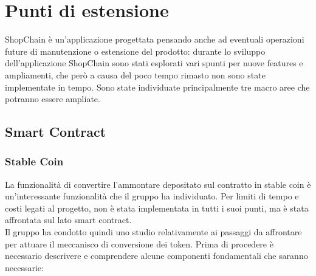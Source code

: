 \section{Punti di estensione} \label{section:punti_estensione}

ShopChain è un'applicazione progettata pensando anche ad eventuali operazioni future di manutenzione o
estensione del prodotto: durante lo sviluppo dell'applicazione ShopChain sono stati esplorati vari spunti per nuove features e ampliamenti, 
che però a causa del poco tempo rimasto non sono state implementate in tempo.
Sono state individuate principalmente tre macro aree che potranno essere ampliate.

\subsection{Smart Contract}

\subsubsection{Stable Coin}

La funzionalità di convertire l'ammontare depositato sul contratto in stable coin è un'interessante funzionalità che il gruppo ha individuato. Per limiti 
di tempo e costi legati al progetto, non è stata implementata in tutti i suoi punti, ma è stata affrontata sul lato smart contract.\\
Il gruppo ha condotto quindi uno studio relativamente ai passaggi da affrontare per attuare il meccanisco di conversione dei token\glo{}.
Prima di procedere è necessario descrivere e comprendere alcune componenti fondamentali che saranno necessarie:

